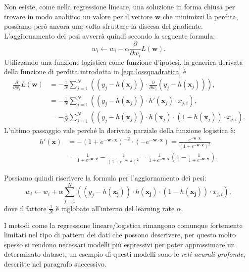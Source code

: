 \documentclass[../../main.tex]{subfiles}
\begin{document}
    Non esiste, come nella regressione lineare, una soluzione in forma chiusa per trovare in modo analitico un valore per il vettore $\boldsymbol{w}$ che minimizzi la perdita, possiamo però ancora una volta sfruttare la discesa del gradiente. L'aggiornamento dei pesi avverrà quindi secondo la seguente formula:
    \[w_i \leftarrow w_i - \alpha \frac{\partial}{\partial w_i} L(\boldsymbol{w}).\]
    Utilizzando una funzione logistica come funzione d'ipotesi, la generica derivata della funzione di perdita introdotta in \eqref{eqn:lossquadratica} è
    \begin{align*}
        \frac{\partial}{\partial w_i} L(\boldsymbol{w}) &= -\frac{1}{N} \sum_{j=1}^N \left((y_j - h(\boldsymbol{x}_j)) \cdot \frac{\partial}{\partial w_i} (y_j - h(\boldsymbol{x}_j)) \right),\\
        &= -\frac{1}{N} \sum_{j=1}^N \left((y_j - h(\boldsymbol{x}_j)) \cdot h'(\boldsymbol{x}_j) \cdot x_{j,i} \right),\\
        &= -\frac{1}{N} \sum_{j=1}^N \left((y_j - h(\boldsymbol{x}_j)) \cdot h(\boldsymbol{x}_j) \cdot (1 - h(\boldsymbol{x}_j)) \cdot x_{j,i} \right).
    \end{align*}
    L'ultimo passaggio vale perché la derivata parziale della funzione logistica è:
    \begin{align*}
        h'(\boldsymbol{x}) &= -(1 + e^{-\boldsymbol{w \cdot x}})^{-2} \cdot (- e^{-\boldsymbol{w \cdot x}})= \frac{e^{-\boldsymbol{w}\cdot \boldsymbol{x}}}{\left(1 + e^{-\boldsymbol{w}\cdot \boldsymbol{x}}\right)^2}\\
        &= \frac{1}{1 + e^{-\boldsymbol{w}\cdot\boldsymbol{x}}} - \frac{1}{\left(1 + e^{-\boldsymbol{w}\cdot\boldsymbol{x}}\right)^2} = \frac{1}{1 + e^{-\boldsymbol{w}\cdot\boldsymbol{x}}}\left(1 - \frac{1}{1 + e^{-\boldsymbol{w}\cdot\boldsymbol{x}}}\right).
    \end{align*}

    Possiamo quindi riscrivere la formula per l'aggiornamento dei pesi:
    \begin{equation}
        w_i \leftarrow w_i + \alpha \sum_{j=1}^N \left((y_j - h(\boldsymbol{x_j})) \cdot h(\boldsymbol{x_j}) \cdot (1 - h(\boldsymbol{x_j})) \cdot x_{j,i} \right),
    \end{equation}
    dove il fattore $\frac{1}{N}$ è inglobato all'interno del learning rate $\alpha$.

    I metodi come la regressione lineare/logistica rimangono comunque fortemente limitati nel tipo di pattern dei dati che possono descrivere, per questo molto spesso si rendono necessari modelli più espressivi per  poter approssimare un determinato dataset, un esempio di questi modelli sono le \textit{reti neurali profonde}, descritte nel paragrafo successivo.
\end{document}
